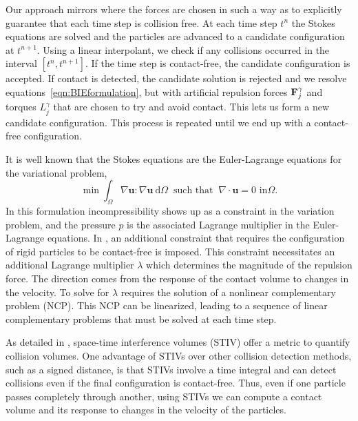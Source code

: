\documentclass[preprint, 10pt]{elsarticle}
\begin{document}
Our approach mirrors \cite{Lu2017} where the forces are chosen in such a way as to
explicitly guarantee that each time step is collision free.  At each time
step $t^n$ the Stokes equations are solved and the particles are
advanced to a candidate configuration at $t^{n+1}$.  Using a linear
interpolant, we check if any collisions occurred in the interval
$[t^n,t^{n+1}]$.  If the time step is contact-free, the candidate
configuration is accepted.  If contact is detected, the candidate
solution is rejected and we resolve
equations~\eqref{eqn:BIEformulation}, but with artificial repulsion forces ${\mathbf{F}}^\gamma_j$ and torques
$L^\gamma_j$ that are chosen to try and avoid contact.  This lets us form a new candidate configuration. This process is repeated until we end up with a contact-free configuration.


It is well known that the Stokes equations  are the Euler-Lagrange equations for the variational problem,
\[ \min \int_{\Omega} \nabla\mathbf{u}:\nabla\mathbf{u}~\text{d}\Omega  ~\text{ such that }~ \nabla\cdot\mathbf{u} = 0 \text{ in
}\Omega.\]
In this formulation incompressibility shows up as a constraint in the variation problem, and the pressure $p$ is the associated Lagrange multiplier in the Euler-Lagrange equations. In \cite{Lu2017}, an additional constraint that requires the configuration of rigid particles to be contact-free is imposed. This constraint necessitates an additional Lagrange multiplier $\lambda$ which determines the magnitude of the repulsion force. The direction comes from the response of the contact volume to changes in the velocity. To solve for $\lambda$ requires the solution of a nonlinear complementary problem (NCP). This NCP can be linearized, leading to a sequence of linear complementary problems that must be solved at each time step.

As detailed in \cite{Lu2017, Harmon2011}, space-time interference volumes (STIV) offer a metric to quantify collision volumes. One advantage of STIVs over other collision detection methods, such as a signed distance, is that STIVs involve a time integral and can detect collisions even if the final configuration is contact-free. Thus, even if one particle passes completely through another, using STIVs we can compute a contact volume and its response to changes in the velocity of the particles.
\end{document}
